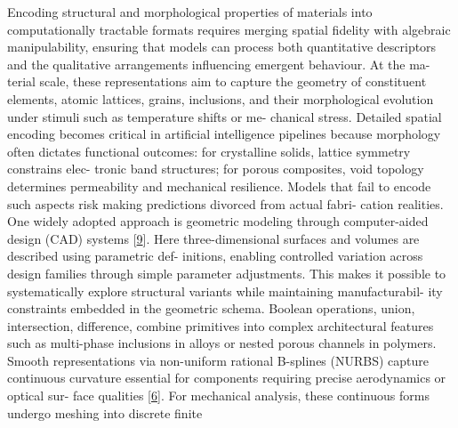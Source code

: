 \documentclass[
]{article}
\begin{document}
Encoding structural and morphological properties of materials into
computationally tractable formats requires merging spatial fidelity with
algebraic manipulability, ensuring that models can process both
quantitative descriptors and the qualitative arrangements influencing
emergent behaviour. At the ma- terial scale, these representations aim
to capture the geometry of constituent elements, atomic lattices,
grains, inclusions, and their morphological evolution under stimuli such
as temperature shifts or me- chanical stress. Detailed spatial encoding
becomes critical in artificial intelligence pipelines because morphology
often dictates functional outcomes: for crystalline solids, lattice
symmetry constrains elec- tronic band structures; for porous composites,
void topology determines permeability and mechanical resilience. Models
that fail to encode such aspects risk making predictions divorced from
actual fabri- cation realities. One widely adopted approach is geometric
modeling through computer-aided design (CAD) systems
{[}\protect\hyperlink{_bookmark49}{9}{]}. Here three-dimensional
surfaces and volumes are described using parametric def- initions,
enabling controlled variation across design families through simple
parameter adjustments. This makes it possible to systematically explore
structural variants while maintaining manufacturabil- ity constraints
embedded in the geometric schema. Boolean operations, union,
intersection, difference, combine primitives into complex architectural
features such as multi-phase inclusions in alloys or nested porous
channels in polymers. Smooth representations via non-uniform rational
B-splines (NURBS) capture continuous curvature essential for components
requiring precise aerodynamics or optical sur- face qualities
{[}\protect\hyperlink{_bookmark46}{6}{]}. For mechanical analysis, these
continuous forms undergo meshing into discrete finite
\end{document}
